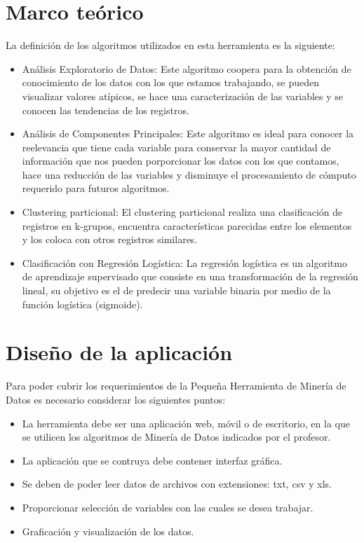 \documentclass{article}
\begin{document}
\section{Marco teórico}
La definición de los algoritmos utilizados en esta herramienta es la siguiente:
\begin{itemize}
\item Análisis Exploratorio de Datos: Este algoritmo coopera para la obtención de conocimiento de los datos con los que estamos trabajando, se pueden visualizar
valores atípicos, se hace una caracterización de las variables y se conocen las tendencias de los registros.

\item Análisis de Componentes Principales: Este algoritmo es ideal para conocer la reelevancia que tiene cada variable para conservar la mayor
cantidad de información que nos pueden porporcionar los datos con los que contamos, hace una reducción de las variables y disminuye el procesamiento de cómputo
requerido para futuros algoritmos.

\item Clustering particional: El clustering particional realiza una clasificación de registros en k-grupos,
encuentra características parecidas entre los elementos y los coloca con otros registros similares.

\item Clasificación con Regresión Logística: La regresión logística es un algoritmo de aprendizaje supervisado que consiste 
en una transformación de la regresión lineal, su objetivo es el de predecir una variable binaria 
por medio de la función logística (sigmoide).

\end{itemize}

\section{Diseño de la aplicación}
Para poder cubrir los requerimientos de la Pequeña Herramienta de Minería de Datos es necesario considerar los siguientes puntos:
\begin{itemize}
\item La herramienta debe ser una aplicación web, móvil o de escritorio, en la que se utilicen los algoritmos de Minería de Datos indicados por el profesor.
\item La aplicación que se contruya debe contener interfaz gráfica.
\item Se deben de poder leer datos de archivos con extensiones: txt, csv y xls.
\item Proporcionar selección de variables con las cuales se desea trabajar.
\item Graficación y visualización de los datos.
\end{itemize}
\end{document}
